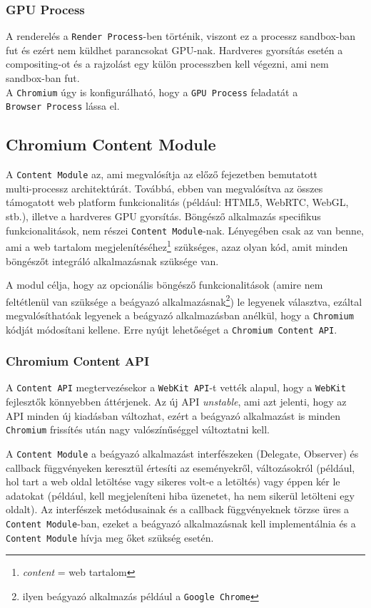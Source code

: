 \documentclass[12pt]{report}
\begin{document}
\subsubsection{GPU Process}
A renderelés a \texttt{Render Process}-ben történik, viszont ez a processz
sandbox-ban fut és ezért nem küldhet parancsokat GPU-nak. Hardveres gyorsítás esetén
a compositing-ot és a rajzolást egy külön processzben kell végezni, ami nem sandbox-ban fut.
\cite{bib-chromium-gpu} \\
A \texttt{Chromium} úgy is konfigurálható, hogy a \texttt{GPU Process} feladatát a \\
\texttt{Browser Process} lássa el.


\subsection{Chromium Content Module}
A \texttt{Content Module} az, ami megvalósítja az előző fejezetben bemutatott \\
multi-processz architektúrát. Továbbá, ebben van megvalósítva az összes támogatott
web platform funkcionalitás (például: HTML5, WebRTC, WebGL, stb.), illetve
a hardveres GPU gyorsítás. Böngésző alkalmazás specifikus funkcionalitások, nem részei
\texttt{Content Module}-nak. Lényegében csak az van benne, ami a web tartalom
megjelenítéséhez\footnote{\textit{content} = web tartalom} szükséges, azaz olyan kód,
amit minden böngészőt integráló alkalmazásnak szüksége van.
\cite{bib-chromium-content-module}

A modul célja, hogy az opcionális böngésző funkcionalitások (amire nem feltétlenül van
szüksége a beágyazó alkalmazásnak\footnote{ilyen beágyazó alkalmazás például a
\texttt{Google Chrome}}) le legyenek választva, ezáltal megvalósíthatóak legyenek
a beágyazó alkalmazásban anélkül, hogy a \texttt{Chromium} kódját módosítani kellene. Erre
nyújt lehetőséget a \texttt{Chromium Content API}.

\subsubsection{Chromium Content API}
A \texttt{Content API} megtervezésekor a \texttt{WebKit API}-t vették alapul,
hogy a \texttt{WebKit} fejlesztők könnyebben áttérjenek. Az új API \textit{unstable}, ami
azt jelenti, hogy az API minden új kiadásban változhat, ezért a beágyazó alkalmazást is
minden \texttt{Chromium} frissítés után nagy valószínűséggel változtatni kell.

A \texttt{Content Module} a beágyazó alkalmazást interfészeken (Delegate, Observer)
és callback függvényeken keresztül értesíti az eseményekről, változásokról (például,
hol tart a web oldal letöltése vagy sikeres volt-e a letöltés) vagy éppen
kér le adatokat (például, kell megjeleníteni hiba üzenetet, ha nem sikerül letölteni egy
oldalt). Az interfészek metódusainak és a callback függvényeknek törzse üres a
\texttt{Content Module}-ban, ezeket a beágyazó alkalmazásnak kell implementálnia és a
\texttt{Content Module} hívja meg őket szükség esetén.
\end{document}
